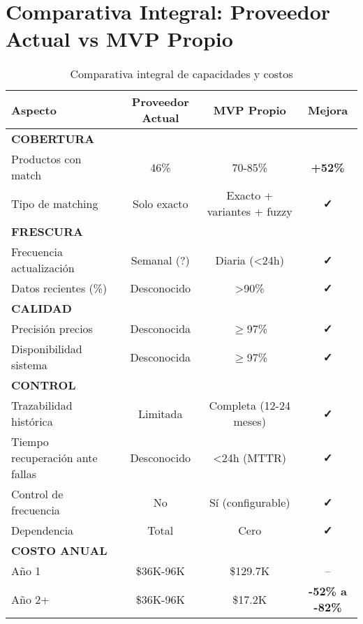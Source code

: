 \documentclass[12pt,a4paper]{article}
\begin{document}
\newpage
\section{Comparativa Integral: Proveedor Actual vs MVP Propio}

\begin{table}[h]
\centering
\small
\begin{tabularx}{\textwidth}{|X|c|c|c|}
\hline
\rowcolor{lightgray}
\textbf{Aspecto} & \textbf{Proveedor Actual} & \textbf{MVP Propio} & \textbf{Mejora} \\
\hline
\textbf{COBERTURA} & & & \\
\hline
Productos con match & 46\% & 70-85\% & \textcolor{successgreen}{\textbf{+52\%}} \\
\hline
Tipo de matching & Solo exacto & Exacto + variantes + fuzzy & \textcolor{successgreen}{\textbf{✓}} \\
\hline
\textbf{FRESCURA} & & & \\
\hline
Frecuencia actualización & Semanal (?) & Diaria (<24h) & \textcolor{successgreen}{\textbf{✓}} \\
\hline
Datos recientes (\%) & Desconocido & >90\% & \textcolor{successgreen}{\textbf{✓}} \\
\hline
\textbf{CALIDAD} & & & \\
\hline
Precisión precios & Desconocida & $\geq$97\% & \textcolor{successgreen}{\textbf{✓}} \\
\hline
Disponibilidad sistema & Desconocida & $\geq$97\% & \textcolor{successgreen}{\textbf{✓}} \\
\hline
\textbf{CONTROL} & & & \\
\hline
Trazabilidad histórica & Limitada & Completa (12-24 meses) & \textcolor{successgreen}{\textbf{✓}} \\
\hline
Tiempo recuperación ante fallas & Desconocido & <24h (MTTR) & \textcolor{successgreen}{\textbf{✓}} \\
\hline
Control de frecuencia & No & Sí (configurable) & \textcolor{successgreen}{\textbf{✓}} \\
\hline
Dependencia & Total & Cero & \textcolor{successgreen}{\textbf{✓}} \\
\hline
\textbf{COSTO ANUAL} & & & \\
\hline
Año 1 & \$36K-96K & \$129.7K & -- \\
\hline
Año 2+ & \$36K-96K & \$17.2K & \textcolor{successgreen}{\textbf{-52\% a -82\%}} \\
\hline
\end{tabularx}
\caption{Comparativa integral de capacidades y costos}
\end{table}
\end{document}
